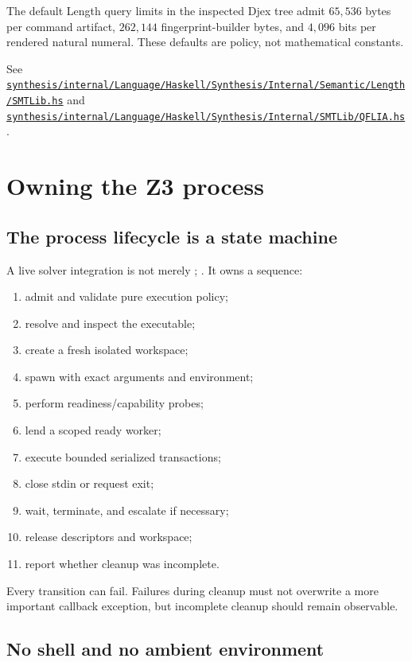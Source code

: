\documentclass[10pt,letterpaper,oneside]{report}
\newcommand{\code}[1]{\texttt{\detokenize{#1}}}
\def\DjexPinnedCommit{7d65eba6f753727ae7b3d734fb4a7e00f1f44aa7}
\def\DjexBase{https://github.com/VladimirReshetnikov/Djex/blob/\DjexPinnedCommit/}
\newcommand{\dpath}[1]{\href{\DjexBase#1}{\nolinkurl{#1}}}
\begin{document}
The default Length query limits in the inspected Djex tree admit $65{,}536$ bytes per command artifact, $262{,}144$ fingerprint-builder bytes, and $4{,}096$ bits per rendered natural numeral. These defaults are policy, not mathematical constants.

\begin{sourcebox}
See \dpath{synthesis/internal/Language/Haskell/Synthesis/Internal/Semantic/Length/SMTLib.hs} and \dpath{synthesis/internal/Language/Haskell/Synthesis/Internal/SMTLib/QFLIA.hs}.
\end{sourcebox}

\chapter{Owning the Z3 process}
\label{chap:process}

\section{The process lifecycle is a state machine}

A live solver integration is not merely \code{write}; \code{read}. It owns a sequence:

\begin{enumerate}
\item admit and validate pure execution policy;
\item resolve and inspect the executable;
\item create a fresh isolated workspace;
\item spawn with exact arguments and environment;
\item perform readiness/capability probes;
\item lend a scoped ready worker;
\item execute bounded serialized transactions;
\item close stdin or request exit;
\item wait, terminate, and escalate if necessary;
\item release descriptors and workspace;
\item report whether cleanup was incomplete.
\end{enumerate}

Every transition can fail. Failures during cleanup must not overwrite a more important callback exception, but incomplete cleanup should remain observable.

\section{No shell and no ambient environment}
\end{document}
